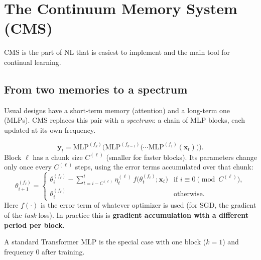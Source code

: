 \documentclass[11pt,a4paper]{article}
\newcommand{\bx}{\mathbf{x}}
\newcommand{\by}{\mathbf{y}}
\begin{document}
\section{The Continuum Memory System (CMS)}\label{sec:cms}

CMS is the part of NL that is easiest to implement and the main tool for continual learning.

\subsection{From two memories to a spectrum}
Usual designs have a short-term memory (attention) and a long-term one (MLPs). CMS replaces this pair with a \emph{spectrum}: a chain of MLP blocks, each updated at its own frequency.

\begin{equation}
  \by_t = \mathrm{MLP}^{(f_k)}\Big(\mathrm{MLP}^{(f_{k-1})}\big(\cdots\mathrm{MLP}^{(f_1)}(\bx_t)\big)\Big).
\end{equation}
Block $\ell$ has a chunk size $C^{(\ell)}$ (smaller for faster blocks). Its parameters change only once every $C^{(\ell)}$ steps, using the error terms accumulated over that chunk:
\begin{equation}
  \theta^{(f_\ell)}_{i+1} =
  \begin{cases}
    \theta^{(f_\ell)}_{i} - \displaystyle\sum_{t=i-C^{(\ell)}}^{i}\eta_t^{(\ell)}\, f\big(\theta_t^{(f_\ell)};\bx_t\big) & \text{if } i \equiv 0 \pmod{C^{(\ell)}},\\[1.2em]
    \theta^{(f_\ell)}_{i} & \text{otherwise.}
  \end{cases}
\end{equation}
Here $f(\cdot)$ is the error term of whatever optimizer is used (for SGD, the gradient of the \emph{task} loss). In practice this is \textbf{gradient accumulation with a different period per block}.

A standard Transformer MLP is the special case with one block ($k=1$) and frequency 0 after training.
\end{document}
